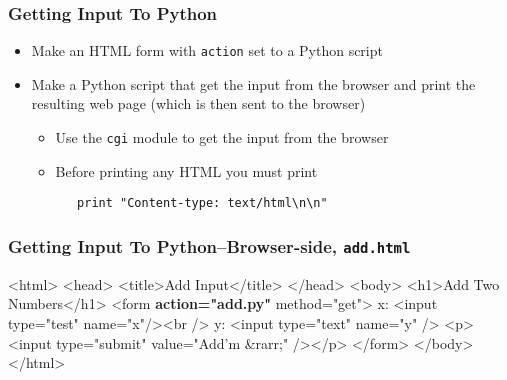 \documentclass[dvipsnames]{beamer}
\begin{document}
\begin{frame}[fragile] 
  \frametitle{Getting Input To Python}
\begin{center}
\end{center}
  \begin{itemize}
  \item Make an HTML form with \texttt{action} set to a Python script
  \item Make a Python script that get the input from the browser and
    print the resulting web page (which is then sent to the browser)
    \begin{itemize}
    \item Use the \texttt{cgi} module to get the input from the
      browser
    \item Before printing any HTML you must print
\begin{verbatim}
   print "Content-type: text/html\n\n"
\end{verbatim}
    \end{itemize}
  \end{itemize}
\end{frame}




\begin{frame}[fragile=singleslide] 
  \frametitle{Getting Input To Python--Browser-side, \texttt{add.html}}
  
\begin{semiverbatim}
<html>
<head>
    <title>Add Input</title>
</head>
<body>
<h1>Add Two Numbers</h1>
<form \textbf{action="add.py"} method="get">
    x: <input type="test" name="x"/><br />
    y: <input type="text" name="y" />
    <p><input type="submit" value="Add'm &rarr;" /></p>
</form>
</body>
</html>
\end{semiverbatim}
\end{frame}
\end{document}

